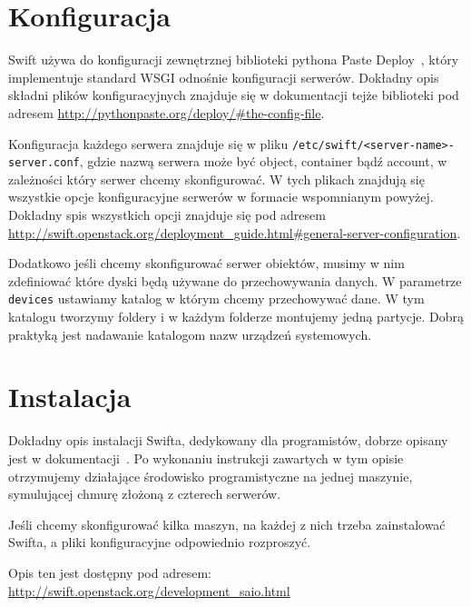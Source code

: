 \section{Konfiguracja}\label{sec:konfiguracja}

Swift używa do konfiguracji zewnętrznej biblioteki pythona Paste Deploy~\cite{paste_deploy}, który implementuje standard WSGI odnośnie konfiguracji serwerów. Dokładny opis składni plików konfiguracyjnych znajduje się w dokumentacji tejże biblioteki pod adresem \url{http://pythonpaste.org/deploy/#the-config-file}. 

Konfiguracja każdego serwera znajduje się w pliku \texttt{/etc/swift/<server-name>-server.conf}, gdzie nazwą serwera może być object, container bądź account, w zależności który serwer chcemy skonfigurować. W tych plikach znajdują się wszystkie opcje konfiguracyjne serwerów w formacie wspomnianym powyżej. Dokładny spis wszystkich opcji znajduje się pod adresem \url{http://swift.openstack.org/deployment_guide.html#general-server-configuration}.

Dodatkowo jeśli chcemy skonfigurować serwer obiektów, musimy w nim zdefiniować które dyski będą używane do przechowywania danych. W parametrze \texttt{devices} ustawiamy katalog w którym chcemy przechowywać dane. W tym katalogu tworzymy foldery i w każdym folderze montujemy jedną partycje. Dobrą praktyką jest nadawanie katalogom nazw urządzeń systemowych.

\section{Instalacja}\label{sec:instalacja}

Dokładny opis instalacji Swifta, dedykowany dla programistów, dobrze opisany jest w dokumentacji~\cite{swift_doc}. Po wykonaniu instrukcji zawartych w tym opisie otrzymujemy działające środowisko programistyczne na jednej maszynie, symulującej chmurę złożoną z czterech serwerów.

Jeśli chcemy skonfigurować kilka maszyn, na każdej z nich trzeba zainstalować Swifta, a pliki konfiguracyjne odpowiednio rozproszyć. 

Opis ten jest dostępny pod adresem: \url{http://swift.openstack.org/development_saio.html}



	

